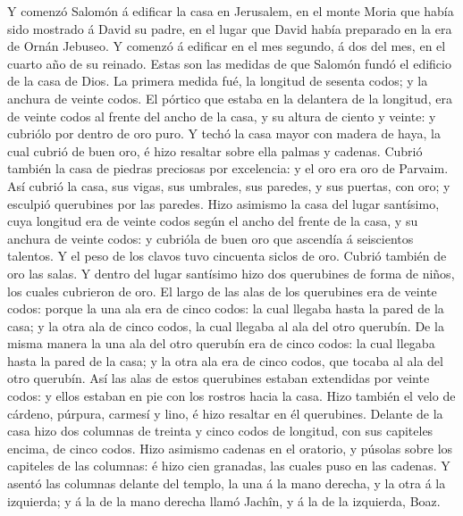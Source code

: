  Y comenzó Salomón á edificar la casa en Jerusalem, en el
monte Moria que había sido mostrado á David su padre, en el lugar que
David había preparado en la era de Ornán Jebuseo.  Y comenzó
á edificar en el mes segundo, á dos del mes, en el cuarto año de su
reinado.  Estas son las medidas de que Salomón fundó el
edificio de la casa de Dios. La primera medida fué, la longitud de
sesenta codos; y la anchura de veinte codos.  El pórtico que
estaba en la delantera de la longitud, era de veinte codos al frente del
ancho de la casa, y su altura de ciento y veinte: y cubriólo por dentro
de oro puro.  Y techó la casa mayor con madera de haya, la
cual cubrió de buen oro, é hizo resaltar sobre ella palmas y cadenas.
 Cubrió también la casa de piedras preciosas por excelencia:
y el oro era oro de Parvaim.  Así cubrió la casa, sus vigas,
sus umbrales, sus paredes, y sus puertas, con oro; y esculpió querubines
por las paredes.  Hizo asimismo la casa del lugar santísimo,
cuya longitud era de veinte codos según el ancho del frente de la casa,
y su anchura de veinte codos: y cubrióla de buen oro que ascendía á
seiscientos talentos.  Y el peso de los clavos tuvo
cincuenta siclos de oro. Cubrió también de oro las salas. 
Y dentro del lugar santísimo hizo dos querubines de forma de niños, los
cuales cubrieron de oro.  El largo de las alas de los
querubines era de veinte codos: porque la una ala era de cinco codos: la
cual llegaba hasta la pared de la casa; y la otra ala de cinco codos, la
cual llegaba al ala del otro querubín.  De la misma manera
la una ala del otro querubín era de cinco codos: la cual llegaba hasta
la pared de la casa; y la otra ala era de cinco codos, que tocaba al ala
del otro querubín.  Así las alas de estos querubines
estaban extendidas por veinte codos: y ellos estaban en pie con los
rostros hacia la casa.  Hizo también el velo de cárdeno,
púrpura, carmesí y lino, é hizo resaltar en él querubines. 
Delante de la casa hizo dos columnas de treinta y cinco codos de
longitud, con sus capiteles encima, de cinco codos.  Hizo
asimismo cadenas en el oratorio, y púsolas sobre los capiteles de las
columnas: é hizo cien granadas, las cuales puso en las cadenas.
 Y asentó las columnas delante del templo, la una á la mano
derecha, y la otra á la izquierda; y á la de la mano derecha llamó
Jachîn, y á la de la izquierda, Boaz.

